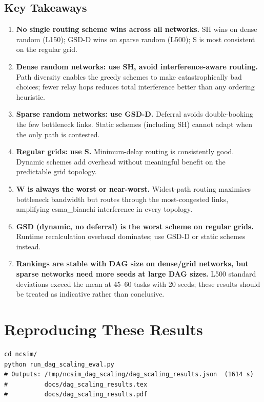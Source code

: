 \documentclass[11pt]{article}
\begin{document}
\subsection{Key Takeaways}

\begin{enumerate}
  \item \textbf{No single routing scheme wins across all networks.}
    SH wins on dense random (L150); GSD-D wins on sparse random (L500);
    S is most consistent on the regular grid.

  \item \textbf{Dense random networks: use SH, avoid interference-aware routing.}
    Path diversity enables the greedy schemes to make catastrophically bad choices;
    fewer relay hops reduces total interference better than any ordering heuristic.

  \item \textbf{Sparse random networks: use GSD-D.}
    Deferral avoids double-booking the few bottleneck links.
    Static schemes (including SH) cannot adapt when the only path is contested.

  \item \textbf{Regular grids: use S.}
    Minimum-delay routing is consistently good.  Dynamic schemes add overhead
    without meaningful benefit on the predictable grid topology.

  \item \textbf{W is always the worst or near-worst.}
    Widest-path routing maximises bottleneck bandwidth but routes through the
    most-congested links, amplifying csma\_bianchi interference in every topology.

  \item \textbf{GSD (dynamic, no deferral) is the worst scheme on regular grids.}
    Runtime recalculation overhead dominates; use GSD-D or static schemes instead.

  \item \textbf{Rankings are stable with DAG size on dense/grid networks,
    but sparse networks need more seeds at large DAG sizes.}
    L500 standard deviations exceed the mean at 45--60 tasks with 20 seeds;
    these results should be treated as indicative rather than conclusive.
\end{enumerate}

\section{Reproducing These Results}

\begin{verbatim}
cd ncsim/
python run_dag_scaling_eval.py
# Outputs: /tmp/ncsim_dag_scaling/dag_scaling_results.json  (1614 s)
#          docs/dag_scaling_results.tex
#          docs/dag_scaling_results.pdf
\end{verbatim}
\end{document}
